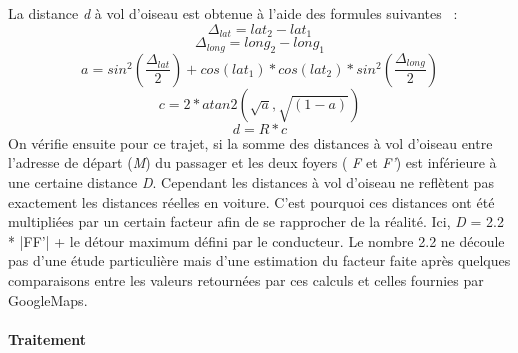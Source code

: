 \documentclass[12pt, a4paper, oneside]{article}
\begin{document}
{{     La distance \textit{d} à vol d'oiseau est obtenue à l'aide des formules suivantes ~\cite{haversine-script}:
    \begin{equation*}
        \Delta_{lat} = lat_{2} - lat_{1}
    \end{equation*}
    \begin{equation*}
        \Delta_{long} = long_{2} - long_{1}
    \end{equation*}
    \begin{equation*}
        a = sin^{2}(\frac{\Delta_{lat}}{2}) + cos(lat_{1}) * cos(lat_{2}) * sin^{2}(\frac{\Delta_{long}}{2})
    \end{equation*}
     \begin{equation*}
         c = 2 * atan2(\sqrt{a},\sqrt{(1-a)})
     \end{equation*}
     \begin{equation*}
        d = R * c
     \end{equation*}     
     On vérifie ensuite pour ce trajet, si la somme des distances à vol d'oiseau entre l'adresse de départ (\textit{M}) du passager et les deux foyers ( \textit{F} et \textit{F'}) est inférieure à une certaine distance \textit{D}. Cependant les distances à vol d'oiseau ne reflètent pas exactement les distances réelles en voiture. C'est pourquoi ces distances ont été multipliées par un certain facteur afin de se rapprocher de la réalité. Ici, \textit{D} = 2.2 * |FF'| + le détour maximum défini par le conducteur. Le nombre 2.2 ne découle pas d'une étude particulière mais d'une estimation du facteur faite après quelques comparaisons entre les valeurs retournées par ces calculs et celles fournies par GoogleMaps.\\\\
     \textbf{Traitement}\\\\
}}
\end{document}
